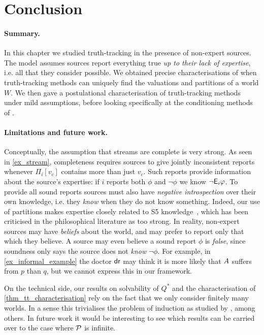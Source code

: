 \section{Conclusion}
\label{sec_conclusion}

\paragraph{Summary.}

In this chapter we studied truth-tracking in the presence of non-expert sources.
The model assumes sources report everything true \emph{up to their lack of
expertise}, i.e. all that they consider possible. We obtained precise
characterisations of when truth-tracking methods can uniquely find the
valuations and partitions of a world $W$. We then gave a postulational
characterisation of truth-tracking methods under mild assumptions, before looking
specifically at the conditioning methods of
\textcite{singleton_booth_22_preprint}.

\paragraph{Limitations and future work.}

Conceptually, the assumption that streams are complete is very strong. As seen
in \cref{ex_stream}, completeness requires sources to give jointly inconsistent
reports whenever $\Pi_i[v_c]$ contains more than just $v_c$. Such reports
provide information about the source's expertise: if $i$ reports both $\phi$
and $\neg\phi$ we know $\neg\mathsf{E}_i\varphi$. To provide all sound reports sources
must also have \emph{negative introspection} over their own knowledge, i.e.
they \emph{know} when they do not know something. Indeed, our use of partitions
makes expertise closely related to S5
knowledge~\cite{singleton_booth_22_preprint,singleton2021logic}, which has been
criticised in the philosophical literature as too strong.
%
In reality, non-expert sources may have \emph{beliefs} about the world, and may
prefer to report only that which they believe. A source may even believe a
sound report $\phi$ is \emph{false}, since soundness only says the source does
not \emph{know} $\neg\phi$. For example, in \cref{ex_informal_example} the
doctor $\mathsf{dr}{}$ may think it is more likely that $A{}$ suffers from $p$
than $q$, but we cannot express this in our framework.

On the technical side, our results on solvability of $Q^*$ and the
characterisation of \cref{thm_tt_characterisation} rely on the fact that we
only consider finitely many worlds. In a sense this trivialises the problem of
induction as studied by \textcite{kelly1997reliable,Baltag_2016}, among others. In
future work it would be interesting to see which results can be carried over to
the case where $\mathcal{P}$ is infinite.
